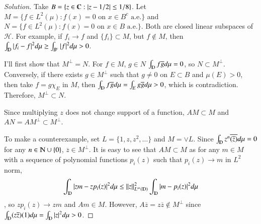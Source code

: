 \documentclass[a4paper, 12pt]{article}
\theoremstyle{Mydefinition}
\theoremstyle{Mytheorem}
\begin{document}
\begin{proof}[Solution]
Take $B = \{z\in\varmathbb{C}: \abs{z-1/2}\leq 1/8\}$. Let $M = \{f\in L^2(\mu): f(x) = 0 \textrm{  on }x\in B^c \textrm{ a.e.}\}$ and $N = \{f\in L^2(\mu): f(x) = 0 \textrm{  on }x\in B \textrm{ a.e.}\}$. Both are closed linear subspaces of $\mathscr{H}$. For example, if $f_i\rightarrow f$ and $\{f_i\}\subset M$, but $f\notin M$, then $\int_{\varmathbb{D}} \abs{f_i-f}^2 d\mu \geq \int_{B^c} \abs{f}^2 d\mu > 0$. 

I'll first show that $M^\perp = N$. For $f\in M$, $g\in N$ $\int_{\varmathbb{D}} f\overline{g} d\mu = 0$, so $N\subset M^\perp$. Conversely, if there exists $g\in M^\perp$ such that $g\neq 0$ on $E\subset B$ and $\mu(E)>0$, then take $f = g\chi_E$ in $M$, then $\int_{\varmathbb{D}} f \overline{g} d\mu = \int_{E} g \overline{g} d\mu > 0$, which is contradiction. Therefore, $M^\perp \subset N$.

Since multiplying $z$ does not change support of a function, $AM\subset M$ and $AN = AM^\perp \subset M^\perp$.

To make a counterexample, set $L=\{1,z, z^2, \ldots\}$ and $M = \vee L$. Since $\int_{\varmathbb{D}} z^n \overline{(\overline{z})} d\mu = 0$ for any $n\in \varmathbb{N}\cup \{0\}$, $\overline{z}\in M^\perp$. It is easy to see that $AM\subset M$ as for any $m\in M$ with a sequence of polynomial functions $p_i(z)$ such that $p_i(z)\rightarrow m$ in $L^2$ norm, $$\int_{\varmathbb{D}} \abs{zm-zp_i(z)}^2 d\mu \leq \norm{z}^2_{L^\infty(\varmathbb{D})} \int_{\varmathbb{D}} \abs{m-p_i(z)}^2 d\mu$$, so $zp_i(z)\rightarrow zm$ and $Am\in M$. However, $A\overline{z} = z\overline{z}\notin M^\perp$ since $\int_{\varmathbb{D}} (z\overline{z})(1) d\mu = \int_{\varmathbb{D}} \abs{z}^2 d\mu> 0$.
\end{proof}

\end{document}
